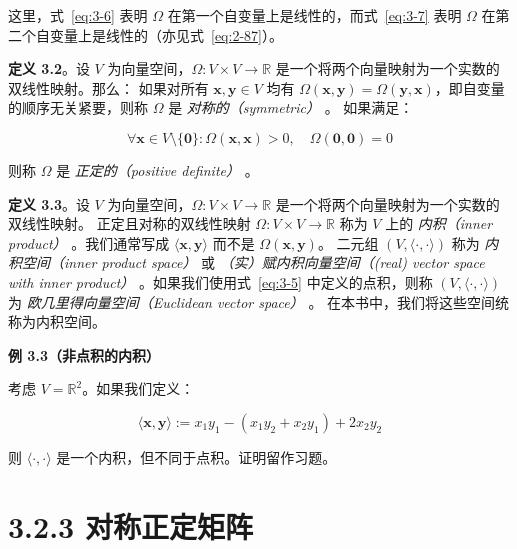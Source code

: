 这里，式~\eqref{eq:3-6} 表明 $ \Omega $ 在第一个自变量上是线性的，而式~\eqref{eq:3-7} 表明 $ \Omega $ 在第二个自变量上是线性的（亦见式~\eqref{eq:2-87}）。

\textbf{定义 3.2}。设 $ V $ 为向量空间，$ \Omega : V \times V \to \mathbb{R} $ 是一个将两个向量映射为一个实数的双线性映射。那么： 如果对所有 $ \boldsymbol{x}, \boldsymbol{y} \in V $ 均有 $ \Omega(\boldsymbol{x}, \boldsymbol{y}) = \Omega(\boldsymbol{y}, \boldsymbol{x}) $，即自变量的顺序无关紧要，则称 $ \Omega $ 是 \emph{对称的（symmetric）} 。 如果满足：

\begin{equation}
\forall \boldsymbol{x} \in V \setminus \{\boldsymbol{0}\} : \Omega(\boldsymbol{x}, \boldsymbol{x}) > 0, \quad \Omega(\boldsymbol{0}, \boldsymbol{0}) = 0
\tag{3.8}\label{eq:3-8}
\end{equation}

则称 $ \Omega $ 是 \emph{正定的（positive definite）} 。

\textbf{定义 3.3}。设 $ V $ 为向量空间，$ \Omega : V \times V \to \mathbb{R} $ 是一个将两个向量映射为一个实数的双线性映射。 正定且对称的双线性映射 $ \Omega : V \times V \to \mathbb{R} $ 称为 $ V $ 上的 \emph{内积（inner product）} 。我们通常写成 $ \langle \boldsymbol{x}, \boldsymbol{y} \rangle $ 而不是 $ \Omega(\boldsymbol{x}, \boldsymbol{y}) $。 二元组 $ (V, \langle \cdot, \cdot \rangle) $ 称为 \emph{内积空间（inner product space）} 或 \emph{（实）赋内积向量空间（(real) vector space with inner product）} 。如果我们使用式~\eqref{eq:3-5} 中定义的点积，则称 $ (V, \langle \cdot, \cdot \rangle) $ 为 \emph{欧几里得向量空间（Euclidean vector space）} 。 在本书中，我们将这些空间统称为内积空间。

\begin{notebox}
\textbf{例 3.3（非点积的内积）}
\end{notebox}

\begin{notebox}
考虑 $ V = \mathbb{R}^2 $。如果我们定义：

\begin{equation}
\langle \boldsymbol{x}, \boldsymbol{y} \rangle := x_1 y_1 - (x_1 y_2 + x_2 y_1) + 2 x_2 y_2
\tag{3.9}\label{eq:3-9}
\end{equation}

则 $ \langle \cdot, \cdot \rangle $ 是一个内积，但不同于点积。证明留作习题。
\end{notebox}

\section*{3.2.3 对称正定矩阵}

